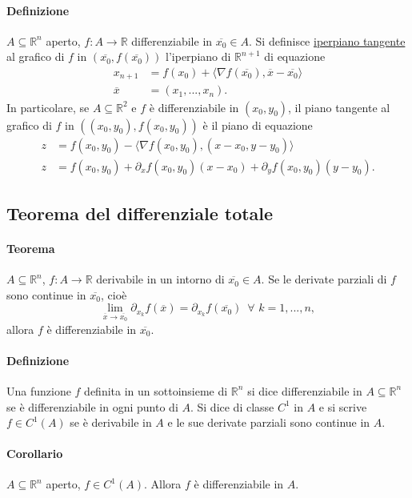 \documentclass{article}
\newcommand{\R}{\mathbb{R}}
\begin{document}
\paragraph{{Definizione}}
$A\subseteq\R^n$ aperto, $f:A \rightarrow \R$ differenziabile in $\overline{x_0}\in A$. Si definisce \underline{iperpiano tangente} al grafico di $f$ in $(\overline{x_0},f(\overline{x_0}))$ l'iperpiano di $\R^{n+1}$ di equazione
\begin{align*}
    x_{n+1}&=f(x_0)+\langle \nabla f(\overline{x_0}), \overline{x}-\overline{x_0} \rangle\\
    \overline{x}&=(x_1,...,x_n).
\end{align*}
In particolare, se $A \subseteq \R^2$ e $f$ è differenziabile in $(x_0,y_0)$, il piano tangente al grafico di $f$ in $((x_0,y_0),f(x_0,y_0))$ è il piano di equazione
\begin{align*}
    z&=f(x_0,y_0)-\langle \nabla f(x_0,y_0),(x-x_0,y-y_0) \rangle\\
    z&=f(x_0,y_0)+\partial_xf(x_0,y_0)(x-x_0)+\partial_yf(x_0,y_0)(y-y_0).
\end{align*}

\subsection{{Teorema del differenziale totale}}
\paragraph{{Teorema}}
$A \subseteq \R^n$, $f:A\rightarrow \R$ derivabile in un intorno di $\overline{x_0}\in A$. Se le derivate parziali di $f$ sono continue in $\overline{x_0}$, cioè
\begin{equation*}
    \lim_{\overline{x}\rightarrow\overline{x_0}}\partial_{x_k}f(\overline{x})=\partial_{x_k}f(\overline{x_0})\,\,\, \forall \,\,k=1,...,n,
\end{equation*}
allora $f$ è differenziabile in $\overline{x_0}$.

\paragraph{{Definizione}}
Una funzione $f$ definita in un sottoinsieme di $\R^n$ si dice differenziabile in $A \subseteq\R^n$ se è differenziabile in ogni punto di $A$. Si dice di classe $C^1$ in $A$ e si scrive $f \in C^1(A)$ se è derivabile in $A$ e le sue derivate parziali sono continue in $A$.

\paragraph{Corollario}
$A\subseteq\R^n$ aperto, $f\in C^1(A)$. Allora $f$ è differenziabile in $A$.
\end{document}
